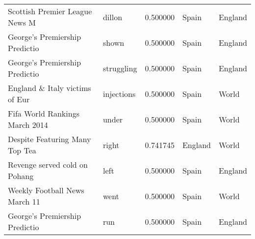 \begin{table}[h]
\begin{tabular}{l|l|l|l|l}
Scottish Premier League News M  & dillon       & 0.500000 & Spain   & England  \\
George's Premiership Predictio  & shown        & 0.500000 & Spain   & England  \\
George's Premiership Predictio  & struggling   & 0.500000 & Spain   & England  \\
England \& Italy victims of Eur & injections   & 0.500000 & Spain   & World    \\
Fifa World Rankings March 2014  & under        & 0.500000 & Spain   & World    \\
Despite Featuring Many Top Tea  & right   & 0.741745 & England & World    \\
Revenge served cold on Pohang   & left         & 0.500000 & Spain   & England  \\
Weekly Football News March 11   & went         & 0.500000 & Spain   & World    \\
George's Premiership Predictio  & run          & 0.500000 & Spain   & England  \\ \hline
\end{tabular}
\end{table}





